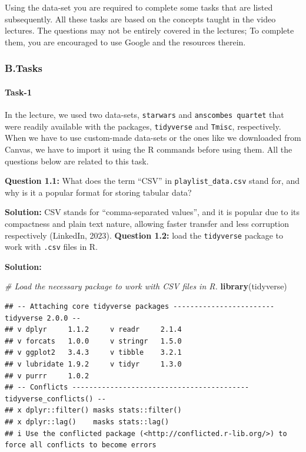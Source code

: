 \documentclass[
]{article}
\newenvironment{Shaded}{\begin{snugshade}}{\end{snugshade}}
\newcommand{\CommentTok}[1]{\textcolor[rgb]{0.56,0.35,0.01}{\textit{#1}}}
\newcommand{\FunctionTok}[1]{\textcolor[rgb]{0.13,0.29,0.53}{\textbf{#1}}}
\newcommand{\NormalTok}[1]{#1}
\begin{document}
Using the data-set you are required to complete some tasks that are
listed subsequently. All these tasks are based on the concepts taught in
the video lectures. The questions may not be entirely covered in the
lectures; To complete them, you are encouraged to use Google and the
resources therein.

\hypertarget{b.tasks}{%
\subsubsection{B.Tasks}\label{b.tasks}}

\hypertarget{task-1}{%
\paragraph{Task-1}\label{task-1}}

In the lecture, we used two data-sets, \texttt{starwars} and
\texttt{anscombe\textquotesingle{}s\ quartet} that were readily
available with the packages, \texttt{tidyverse} and \texttt{Tmisc},
respectively. When we have to use custom-made data-sets or the ones like
we downloaded from Canvas, we have to import it using the R commands
before using them. All the questions below are related to this task.

\textbf{Question 1.1:} What does the term ``CSV'' in
\texttt{playlist\_data.csv} stand for, and why is it a popular format
for storing tabular data?

\textbf{Solution:} CSV stands for ``comma-separated values'', and it is
popular due to its compactness and plain text nature, allowing faster
transfer and less corruption respectively (LinkedIn, 2023).
\textbf{Question 1.2:} load the \texttt{tidyverse} package to work with
\texttt{.csv} files in R.

\textbf{Solution:}

\begin{Shaded}
\begin{Highlighting}[]
\CommentTok{\# Load the necessary package to work with CSV files in R.}
\FunctionTok{library}\NormalTok{(tidyverse)}
\end{Highlighting}
\end{Shaded}

\begin{verbatim}
## -- Attaching core tidyverse packages ------------------------ tidyverse 2.0.0 --
## v dplyr     1.1.2     v readr     2.1.4
## v forcats   1.0.0     v stringr   1.5.0
## v ggplot2   3.4.3     v tibble    3.2.1
## v lubridate 1.9.2     v tidyr     1.3.0
## v purrr     1.0.2     
## -- Conflicts ------------------------------------------ tidyverse_conflicts() --
## x dplyr::filter() masks stats::filter()
## x dplyr::lag()    masks stats::lag()
## i Use the conflicted package (<http://conflicted.r-lib.org/>) to force all conflicts to become errors
\end{verbatim}
\end{document}
